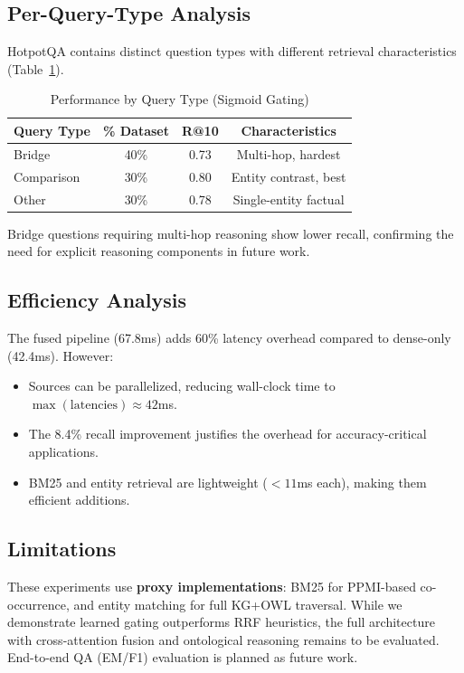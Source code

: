 \documentclass[11pt,a4paper]{article}
\begin{document}
\subsection{Per-Query-Type Analysis}

HotpotQA contains distinct question types with different retrieval characteristics (Table~\ref{tab:query_types}).

\begin{table}[h]
\centering
\caption{Performance by Query Type (Sigmoid Gating)}
\label{tab:query_types}
\begin{tabular}{lccc}
\toprule
\textbf{Query Type} & \textbf{\% Dataset} & \textbf{R@10} & \textbf{Characteristics} \\
\midrule
Bridge & 40\% & 0.73 & Multi-hop, hardest \\
Comparison & 30\% & 0.80 & Entity contrast, best \\
Other & 30\% & 0.78 & Single-entity factual \\
\bottomrule
\end{tabular}
\end{table}

Bridge questions requiring multi-hop reasoning show lower recall, confirming the need for explicit reasoning components in future work.

\subsection{Efficiency Analysis}

The fused pipeline (67.8ms) adds 60\% latency overhead compared to dense-only (42.4ms). However:
\begin{itemize}
    \item Sources can be parallelized, reducing wall-clock time to $\max(\text{latencies}) \approx 42$ms.
    \item The 8.4\% recall improvement justifies the overhead for accuracy-critical applications.
    \item BM25 and entity retrieval are lightweight ($<11$ms each), making them efficient additions.
\end{itemize}

\subsection{Limitations}

These experiments use \textbf{proxy implementations}: BM25 for PPMI-based co-occurrence, and entity matching for full KG+OWL traversal. While we demonstrate learned gating outperforms RRF heuristics, the full architecture with cross-attention fusion and ontological reasoning remains to be evaluated. End-to-end QA (EM/F1) evaluation is planned as future work.
\end{document}
